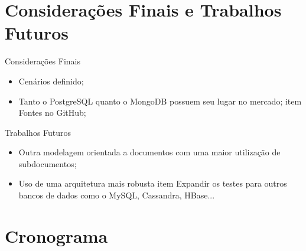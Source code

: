 \section{Considerações Finais e Trabalhos Futuros}

\begin{frame}{Considerações Finais}
\begin{itemize}
\item Cenários definido;
\item Tanto o PostgreSQL quanto o MongoDB possuem seu lugar no mercado;
item Fontes no GitHub;
\end{itemize}
\end{frame}



\begin{frame}{Trabalhos Futuros}
\begin{itemize}
\item Outra modelagem orientada a documentos com uma maior utilização de subdocumentos;
\item Uso de uma arquitetura mais robusta
item Expandir os testes para outros bancos de dados como o MySQL, Cassandra, HBase...
\end{itemize}
\end{frame}




\section{Cronograma}

\newenvironment{changemargin}[2]{%
  \begin{list}{}{%
    \setlength{\topsep}{0pt}%
    \setlength{\leftmargin}{#1}%
    \setlength{\rightmargin}{#2}%
    \setlength{\listparindent}{\parindent}%
    \setlength{\itemindent}{\parindent}%
    \setlength{\parsep}{\parskip}%
  }%
  \item[]}{\end{list}}


